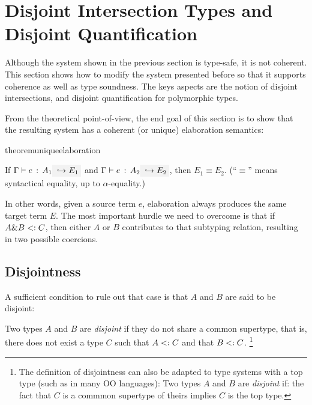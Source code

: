 \section{Disjoint Intersection Types and Disjoint Quantification}
\label{sec:disjoint}

Although the system shown in the previous section is type-safe, it is not
coherent. This section shows how to modify the system presented before so that it
supports coherence as well as type soundness. The keys aspects are the notion of
disjoint intersections, and disjoint quantification for polymorphic types.

From the theoretical point-of-view, the end goal of this section is to show that the resulting system has
a coherent (or unique) elaboration semantics:
\begin{restatable}{theorem}{uniqueelaboration}
  \label{theorem:unique-elaboration}

  If $\jtype \Gamma e {A_1} \yields {E_1}$ and $\jtype \Gamma e {A_2} \yields
  {E_2}$, then $E_1 \equiv E_2$. (``$\equiv$'' means syntactical equality, up to
  $\alpha$-equality.)

\end{restatable}

\noindent In other words, given a source term $e$, elaboration always produces
the same target term $E$. The most important hurdle we need to overcome is that
if $A \& B <: C$, then either $A$ or $B$ contributes to that subtyping
relation, resulting in two possible coercions. 

\subsection{Disjointness}
A sufficient condition to rule out that case is that $A$ and $B$ are said to be disjoint:

\begin{definition}
  Two types $A$ and $B$ are \emph{disjoint} if they do not share a common
  supertype, that is, there does not exist a type $C$ such that $A <: C$
  and that $B <: C$. \footnote{
  The definition of disjointness can also be adapted to type systems with a top
  type (such as \lstinline@Object@ in many OO languages): Two types $A$ and $B$
  are \emph{disjoint} if: the fact that $C$ is a commmon supertype of theirs
  implies $C$ is the top type.
  }
\end{definition}

